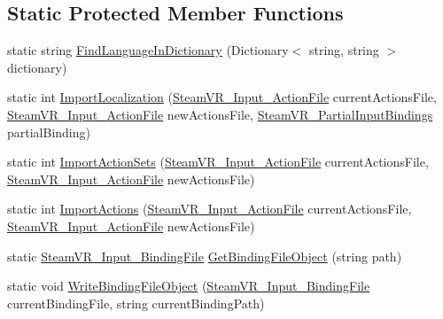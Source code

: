 \subsection*{Static Protected Member Functions}
\begin{DoxyCompactItemize}
\item 
static string \mbox{\hyperlink{class_valve_1_1_v_r_1_1_steam_v_r___input___action_manifest___manager_ab2c7d1be12b6eb0b68f6b17464d924cb}{Find\+Language\+In\+Dictionary}} (Dictionary$<$ string, string $>$ dictionary)
\item 
static int \mbox{\hyperlink{class_valve_1_1_v_r_1_1_steam_v_r___input___action_manifest___manager_a81d994e11943d34cc5447bc571f3cd4a}{Import\+Localization}} (\mbox{\hyperlink{class_valve_1_1_v_r_1_1_steam_v_r___input___action_file}{Steam\+V\+R\+\_\+\+Input\+\_\+\+Action\+File}} current\+Actions\+File, \mbox{\hyperlink{class_valve_1_1_v_r_1_1_steam_v_r___input___action_file}{Steam\+V\+R\+\_\+\+Input\+\_\+\+Action\+File}} new\+Actions\+File, \mbox{\hyperlink{class_valve_1_1_v_r_1_1_steam_v_r___partial_input_bindings}{Steam\+V\+R\+\_\+\+Partial\+Input\+Bindings}} partial\+Binding)
\item 
static int \mbox{\hyperlink{class_valve_1_1_v_r_1_1_steam_v_r___input___action_manifest___manager_ae05cd013681c8f20325b146f570d42db}{Import\+Action\+Sets}} (\mbox{\hyperlink{class_valve_1_1_v_r_1_1_steam_v_r___input___action_file}{Steam\+V\+R\+\_\+\+Input\+\_\+\+Action\+File}} current\+Actions\+File, \mbox{\hyperlink{class_valve_1_1_v_r_1_1_steam_v_r___input___action_file}{Steam\+V\+R\+\_\+\+Input\+\_\+\+Action\+File}} new\+Actions\+File)
\item 
static int \mbox{\hyperlink{class_valve_1_1_v_r_1_1_steam_v_r___input___action_manifest___manager_af0f4c904c4fb8cd0d233a30c9b1b04fc}{Import\+Actions}} (\mbox{\hyperlink{class_valve_1_1_v_r_1_1_steam_v_r___input___action_file}{Steam\+V\+R\+\_\+\+Input\+\_\+\+Action\+File}} current\+Actions\+File, \mbox{\hyperlink{class_valve_1_1_v_r_1_1_steam_v_r___input___action_file}{Steam\+V\+R\+\_\+\+Input\+\_\+\+Action\+File}} new\+Actions\+File)
\item 
static \mbox{\hyperlink{class_valve_1_1_v_r_1_1_steam_v_r___input___binding_file}{Steam\+V\+R\+\_\+\+Input\+\_\+\+Binding\+File}} \mbox{\hyperlink{class_valve_1_1_v_r_1_1_steam_v_r___input___action_manifest___manager_a686bacb75cf86fba501b361d36f55e86}{Get\+Binding\+File\+Object}} (string path)
\item 
static void \mbox{\hyperlink{class_valve_1_1_v_r_1_1_steam_v_r___input___action_manifest___manager_ab87ae830f2769600bc2073e0f9bd4ab5}{Write\+Binding\+File\+Object}} (\mbox{\hyperlink{class_valve_1_1_v_r_1_1_steam_v_r___input___binding_file}{Steam\+V\+R\+\_\+\+Input\+\_\+\+Binding\+File}} current\+Binding\+File, string current\+Binding\+Path)

\end{DoxyCompactItemize}
